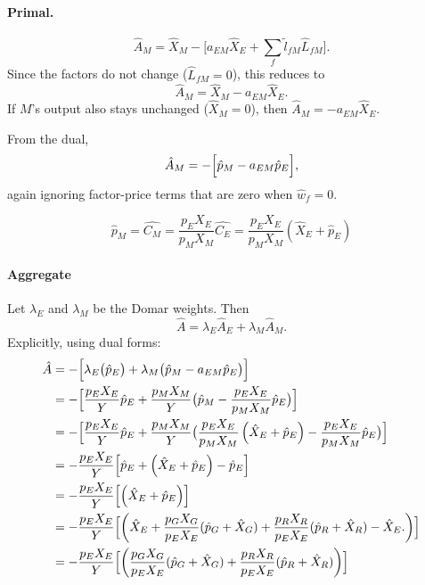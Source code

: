 \documentclass[11pt]{article}
\begin{document}
\paragraph{Primal.}
\[
  \hat{A}_M
   = 
  \hat{X}_M
   - 
  \bigl[a_{EM} \hat{X}_E
     + 
    \sum_{f}\tilde{l}_{fM} \hat{L}_{fM}\bigr].
\]
Since the factors do not change ($\hat{L}_{fM}=0$), this reduces to
\[
  \hat{A}_M
   = 
  \hat{X}_M 
   - 
  a_{EM} \hat{X}_E.
\]
If $M$'s output also stays unchanged ($\hat{X}_M=0$), then $\hat{A}_M=- a_{EM} \hat{X}_E$. 

From the dual,
\[
  \hat{A}_M
   = 
  - \Bigl[ 
      \hat{p}_M
       - 
      a_{EM} \hat{p}_E
    \Bigr],
\]
again ignoring factor-price terms that are zero when $\hat{w}_f=0$.

\begin{equation*}
      \hat{p}_M=\hat{C_M}=\frac{p_EX_E}{p_MX_M}\hat{C_E}=\frac{p_EX_E}{p_MX_M}\left(\hat{X}_E+\hat{p}_E\right)
\end{equation*}

\paragraph{Aggregate}

Let $\lambda_E$ and $\lambda_M$ be the Domar weights. Then
\[
  \hat{A}
   = 
  \lambda_E \hat{A}_E
   + 
  \lambda_M \hat{A}_M.
\]
Explicitly, using dual forms:
\begin{align*}
     \hat{A}
   &= 
  - \Bigl[
    \lambda_E \bigl(\hat{p}_E\bigr)
     + 
    \lambda_M \bigl(\hat{p}_M - a_{EM} \hat{p}_E\bigr)
  \Bigr]\\
 &=  - \Bigl[\frac{p_EX_E}{Y} \hat{p}_E
     + 
   \frac{p_MX_M}{Y}\bigl(\hat{p}_M - \frac{p_EX_E}{p_MX_M} \hat{p}_E\bigr)
  \Bigr]\\
  &=  - \Bigl[\frac{p_EX_E}{Y} \hat{p}_E
     + 
   \frac{p_MX_M}{Y}\bigl(\frac{p_EX_E}{p_MX_M}\left(\hat{X}_E+\hat{p}_E\right) - \frac{p_EX_E}{p_MX_M} \hat{p}_E\bigr)
  \Bigr]\\
  &= - \frac{p_EX_E}{Y}\Bigl[\hat{p}_E 
  + \left(\hat{X}_E+\hat{p}_E\right) - \hat{p}_E
  \Bigr]\\
    &= - \frac{p_EX_E}{Y}\Bigl[
  \left(\hat{X}_E+\hat{p}_E\right)
  \Bigr]\\
  &=
  - \frac{p_EX_E}{Y}\Bigl[
  \left(\hat{X}_E+\frac{p_G X_G}{p_E X_E} 
      (\hat{p}_G + \hat{X}_G)
     + 
    \frac{p_R X_R}{p_E X_E} 
      (\hat{p}_R + \hat{X}_R)
     - 
    \hat{X}_E.\right)
  \Bigr]\\
   &=
  - \frac{p_EX_E}{Y}\Bigl[
  \left(\frac{p_G X_G}{p_E X_E} 
      (\hat{p}_G + \hat{X}_G)
     + 
    \frac{p_R X_R}{p_E X_E} 
      (\hat{p}_R + \hat{X}_R)
    \right)
  \Bigr]\\
\end{align*}
\end{document}
